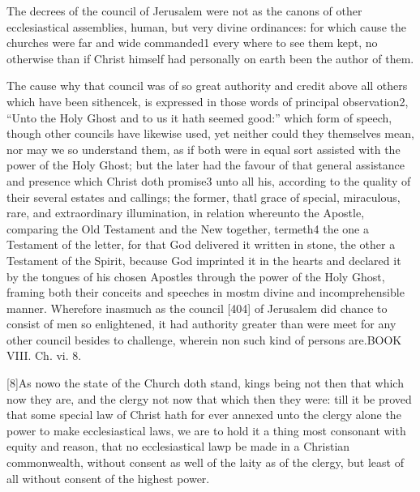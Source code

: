The decrees of the council of Jerusalem were not as the canons of other ecclesiastical assemblies, human, but very divine ordinances: for which cause the churches were far and wide commanded1 every where to see them kept, no otherwise than if Christ himself had personally on earth been the author of them.

The cause why that council was of so great authority and credit above all others which have been sithencek, is expressed in those words of principal observation2, “Unto the Holy Ghost and to us it hath seemed good:” which form of speech, though other councils have likewise used, yet neither could they themselves mean, nor may we so understand them, as if both were in equal sort assisted with the power of the Holy Ghost; but the later had the favour of that general assistance and presence which Christ doth promise3 unto all his, according to the quality of their several estates and callings; the former, thatl grace of special, miraculous, rare, and extraordinary illumination, in relation whereunto the Apostle, comparing the Old Testament and the New together, termeth4 the one a Testament of the letter, for that God delivered it written in stone, the other a Testament of the Spirit, because God imprinted it in the hearts and declared it by the tongues of his chosen Apostles through the power of the Holy Ghost, framing both their conceits and speeches in mostm divine and incomprehensible manner. Wherefore inasmuch as the council [404] of Jerusalem did chance to consist of men so enlightened, it had authority greater than were meet for any other council besides to challenge, wherein non such kind of persons are.BOOK VIII. Ch. vi. 8.

[8]As nowo the state of the Church doth stand, kings being not then that which now they are, and the clergy not now that which then they were: till it be proved that some special law of Christ hath for ever annexed unto the clergy alone the power to make ecclesiastical laws, we are to hold it a thing most consonant with equity and reason, that no ecclesiastical lawp be made in a Christian commonwealth, without consent as well of the laity as of the clergy, but least of all without consent of the highest power.

